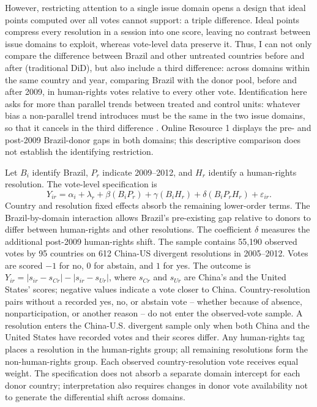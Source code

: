 \documentclass[referee,pdflatex,sn-basic]{sn-jnl}
\theoremstyle{thmstylethree}
\begin{document}
However, restricting attention to a single issue domain opens a design that ideal points computed over all votes cannot support: a triple difference. Ideal points compress every resolution in a session into one score, leaving no contrast between issue domains to exploit, whereas vote-level data preserve it. Thus, I can not only compare the difference between Brazil and other untreated countries before and after (traditional DiD), but also include a third difference: across domains within the same country and year, comparing Brazil with the donor pool, before and after 2009, in human-rights votes relative to every other vote. Identification here asks for more than parallel trends between treated and control units: whatever bias a non-parallel trend introduces must be the same in the two issue domains, so that it cancels in the third difference \citep{olden_moen2022}. Online Resource 1 displays the pre- and post-2009 Brazil-donor gaps in both domains; this descriptive comparison does not establish the identifying restriction.

Let \(B_i\) identify Brazil, \(P_r\) indicate 2009--2012, and \(H_r\) identify a human-rights resolution. The vote-level specification is
\[
Y_{ir}=\alpha_i+\lambda_r+\beta(B_iP_r)+\gamma(B_iH_r)+\delta(B_iP_rH_r)+\varepsilon_{ir}.
\]
Country and resolution fixed effects absorb the remaining lower-order terms. The Brazil-by-domain interaction allows Brazil's pre-existing gap relative to donors to differ between human-rights and other resolutions. The coefficient \(\delta\) measures the additional post-2009 human-rights shift. The sample contains 55,190 observed votes by 95 countries on 612 China-US divergent resolutions in 2005--2012. Votes are scored \(-1\) for no, \(0\) for abstain, and \(1\) for yes. The outcome is \(Y_{ir}=|s_{ir}-s_{Cr}|-|s_{ir}-s_{Ur}|\), where \(s_{Cr}\) and \(s_{Ur}\) are China's and the United States' scores; negative values indicate a vote closer to China. Country-resolution pairs without a recorded yes, no, or abstain vote -- whether because of absence, nonparticipation, or another reason -- do not enter the observed-vote sample. A resolution enters the China-U.S. divergent sample only when both China and the United States have recorded votes and their scores differ. Any human-rights tag places a resolution in the human-rights group; all remaining resolutions form the non-human-rights group. Each observed country-resolution vote receives equal weight. The specification does not absorb a separate domain intercept for each donor country; interpretation also requires changes in donor vote availability not to generate the differential shift across domains.
\end{document}
